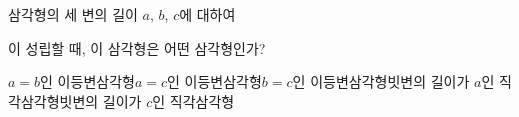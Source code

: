 삼각형의 세 변의 길이 $a$, $b$, $c$에 대하여\par\smallskip{}\par\smallskip\noindent 이 성립할 때, 이 삼각형은 어떤 삼각형인가?
\begin{choicesv}{$a=b$인 이등변삼각형}{$a=c$인 이등변삼각형}{$b=c$인 이등변삼각형}{빗변의 길이가 $a$인 직각삼각형}{빗변의 길이가 $c$인 직각삼각형}\end{choicesv}

